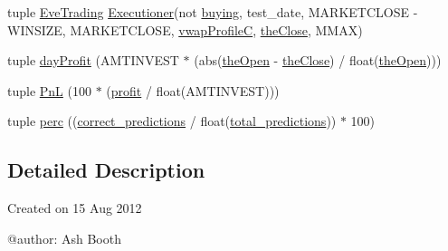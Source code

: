 \begin{DoxyCompactItemize}
\item 
tuple \hyperlink{namespacemain_a55b19868bf4a9d05834347d658030e7f}{Eve\-Trading} \hyperlink{classexecutioner_1_1_executioner}{Executioner}(not \hyperlink{namespacemain_ace774159e8fcc00c1958a240079dd5e2}{buying}, test\-\_\-date, M\-A\-R\-K\-E\-T\-C\-L\-O\-S\-E -\/ W\-I\-N\-S\-I\-Z\-E, M\-A\-R\-K\-E\-T\-C\-L\-O\-S\-E, \hyperlink{namespacemain_a98bb2a52e5b44a9ceba4f520b3344bd8}{vwap\-Profile\-C}, \hyperlink{namespacemain_a7b7f8e1866fa939903d669eda1f85843}{the\-Close}, M\-M\-A\-X)
\item 
tuple \hyperlink{namespacemain_a26df9d6e1bf44bd992060b30c6a7a403}{day\-Profit} (A\-M\-T\-I\-N\-V\-E\-S\-T $\ast$ (abs(\hyperlink{namespacemain_a5ddde740f03e7759f7635b84f49c0cde}{the\-Open} -\/ \hyperlink{namespacemain_a7b7f8e1866fa939903d669eda1f85843}{the\-Close}) / float(\hyperlink{namespacemain_a5ddde740f03e7759f7635b84f49c0cde}{the\-Open})))
\item 
tuple \hyperlink{namespacemain_a3479b13a7722446bbb0445aea9b4c7d3}{Pn\-L} (100 $\ast$ (\hyperlink{namespacemain_a71a9921366b31bec8dfbbdc963039a1a}{profit} / float(A\-M\-T\-I\-N\-V\-E\-S\-T)))
\item 
tuple \hyperlink{namespacemain_ae9fa3f5086214b1a435c317bfeccfe8c}{perc} ((\hyperlink{namespacemain_af624554e0f6b710e1be0ba525c717b48}{correct\-\_\-predictions} / float(\hyperlink{namespacemain_a0796e61e25078d7fc619d17d9ef2016f}{total\-\_\-predictions})) $\ast$ 100)
\end{DoxyCompactItemize}


\subsection{Detailed Description}
\begin{DoxyVerb}Created on 15 Aug 2012

@author: Ash Booth
\end{DoxyVerb}
 

